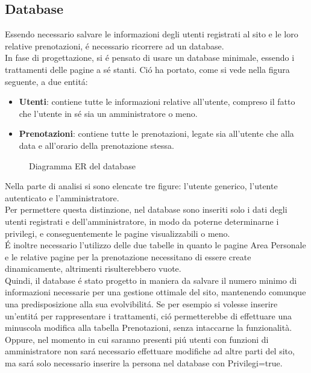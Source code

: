 \documentclass[]{article}
\begin{document}
\subsection{Database}
\label{subsec:database}
Essendo necessario salvare le informazioni degli utenti registrati al sito e le loro relative prenotazioni, é necessario ricorrere ad un database.\\
In fase di progettazione, si é pensato di usare un database minimale, essendo i trattamenti delle pagine a sé stanti. Ció ha portato, come si vede nella figura seguente, a due entitá:
\begin{itemize}
	\item \textbf{Utenti}: contiene tutte le informazioni relative all'utente, compreso il fatto che l'utente in sé sia un amministratore o meno.
	\item \textbf{Prenotazioni}: contiene tutte le prenotazioni, legate sia all'utente che alla data e all'orario della prenotazione stessa.
\end{itemize}

\begin{figure}[H]
	\centering
	\caption{Diagramma ER del database}
\end{figure}

Nella parte di analisi si sono elencate tre figure: l'utente generico, l'utente autenticato e l'amministratore.\\
Per permettere questa distinzione, nel database sono inseriti solo i dati degli utenti registrati e dell'amministratore, in modo da poterne determinarne i privilegi, e conseguentemente le pagine visualizzabili o meno.\\
É inoltre necessario l'utilizzo delle due tabelle in quanto le pagine Area Personale e le relative pagine per la prenotazione necessitano di essere create dinamicamente, altrimenti risulterebbero vuote.\\
Quindi, il database é stato progetto in maniera da salvare il numero minimo di informazioni necessarie per una gestione ottimale del sito, mantenendo comunque una predisposizione alla sua evolvibilitá. Se per esempio si volesse inserire un'entitá per rappresentare i trattamenti, ció permetterebbe di effettuare una minuscola modifica alla tabella Prenotazioni, senza intaccarne la funzionalità. Oppure, nel momento in cui saranno presenti piú utenti con funzioni di amministratore non sará necessario effettuare modifiche ad altre parti del sito, ma sará solo necessario inserire la persona nel database con Privilegi=true.
\end{document}
